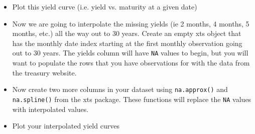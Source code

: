 \documentclass[12pt]{article}
\begin{document}
\begin{itemize}
\item Plot this yield curve (i.e. yield vs. maturity at a given date)
\item Now we are going to interpolate the missing yields (ie 2 months, 4
months, 5 months, etc.) all the way out to 30 years. Create an empty
xts object that has the monthly date index starting at the first
monthly observation going out to 30 years. The yields column will
have \verb~NA~ values to begin, but you will want to populate the rows
that you have observations for with the data from the treasury
website.
\item Now create two more columns in your dataset using \verb~na.approx()~ and
\verb~na.spline()~ from the xts package. These functions will replace the
\verb~NA~ values with interpolated values.
\item Plot your interpolated yield curves
\end{itemize}
\end{document}
